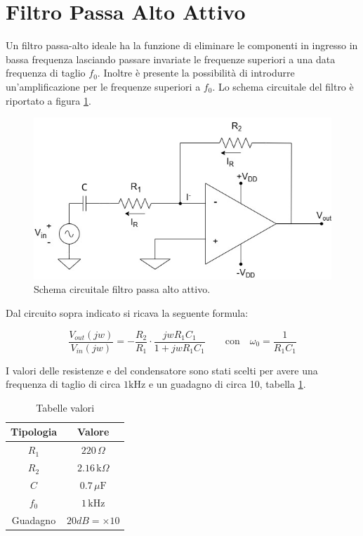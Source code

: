 \documentclass[a4paper,12pt]{article}
\begin{document}


\section*{Filtro Passa Alto Attivo} 
 Un filtro passa-alto ideale ha la funzione di eliminare le componenti in ingresso in bassa frequenza lasciando passare invariate le frequenze superiori a una data frequenza di taglio $f_0$. Inoltre è presente la possibilità di introdurre un'amplificazione per le frequenze superiori a $f_0$. Lo schema circuitale del filtro è riportato a figura \ref{fig:filtroPassaAlto}. 
\begin{figure}[h]
    \centering
    \includegraphics[width = 0.5\linewidth]{immagini/filtro_passa_alto.png}
    \caption{Schema circuitale filtro passa alto attivo.}
    \label{fig:filtroPassaAlto}
\end{figure}

 Dal circuito sopra indicato si ricava la seguente formula:

 $$\dfrac{V_{out}(jw)}{V_{in}(jw)}=-\dfrac{R_{2}}{R_{1}}\cdot\dfrac{jwR_{1}C_{1}}{1+jwR_{1}C_{1}}  \qquad  \text{con} \quad \omega_{0}=\dfrac{1}{R_{1}C_{1}}$$

 I valori delle resistenze e del condensatore sono stati scelti per avere una frequenza di taglio di circa $1\mathrm{kHz}$ e un guadagno di circa 10, tabella \ref{tab:valori_passa_alto}.
 
 \begin{table}[h]
 \centering
 \begin{tabular}{cc}
 \hline
 \textbf{Tipologia} & \textbf{Valore} \\
 \hline
 $R_1$ & $220\,\Omega$\\
 $R_2$ & $2.16\,\mathrm{k}\Omega$\\
 $C$ & $0.7\,\mu\mathrm{F}$\\
 $f_0$ & $1\,\mathrm{kHz}$\\
 Guadagno & $20dB =\times10$\\
 \hline
 \end{tabular}
 \caption{Tabelle valori}
 \label{tab:valori_passa_alto}
 \end{table}
    
\end{document}
